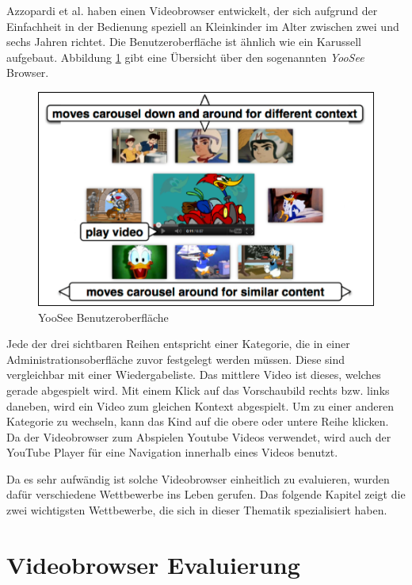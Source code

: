 \documentclass[11pt,a4paper]{report}
\begin{document}
Azzopardi et al. \cite{azzopardi2012yoosee} haben einen Videobrowser entwickelt, der sich aufgrund der Einfachheit in der Bedienung speziell an Kleinkinder im Alter zwischen zwei und sechs Jahren richtet. Die Benutzeroberfläche ist ähnlich wie ein Karussell aufgebaut. Abbildung \ref{yoosee} gibt eine Übersicht über den sogenannten \emph{YooSee} Browser.
\begin{figure}[h]
\begin{center}
\includegraphics[scale=0.9]{./images/40.png}
\caption{YooSee Benutzeroberfläche \cite{azzopardi2012yoosee}}
\label{yoosee}
\end{center}
\end{figure}
Jede der drei sichtbaren Reihen entspricht einer Kategorie, die in einer Administrationsoberfläche zuvor festgelegt werden müssen. Diese sind vergleichbar mit einer Wiedergabeliste. Das mittlere Video ist dieses, welches gerade abgespielt wird. Mit einem Klick auf das Vorschaubild rechts bzw. links daneben, wird ein Video zum gleichen Kontext abgespielt. Um zu einer anderen Kategorie zu wechseln, kann das Kind auf die obere oder untere Reihe klicken. Da der Videobrowser zum Abspielen Youtube Videos verwendet, wird auch der YouTube Player für eine Navigation innerhalb eines Videos benutzt.

Da es sehr aufwändig ist solche Videobrowser einheitlich zu evaluieren, wurden dafür verschiedene Wettbewerbe ins Leben gerufen. Das folgende Kapitel zeigt die zwei wichtigsten Wettbewerbe, die sich in dieser Thematik spezialisiert haben.

\section{Videobrowser Evaluierung}
\end{document}

